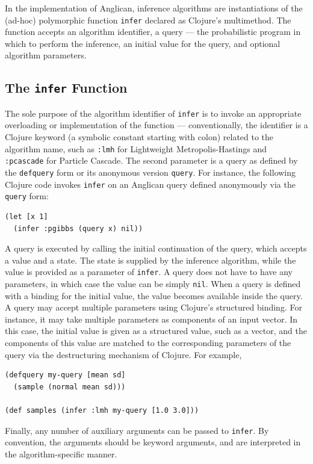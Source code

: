 \documentclass[preprint]{sigplanconf}
\begin{document}
In the implementation of Anglican, inference algorithms are
instantiations of the (ad-hoc) polymorphic function
\texttt{infer} declared as Clojure's multimethod\iftoggle{full}{
in the \texttt{anglican.{\linebreak[0]}inference}
namespace}{}. The function accepts an algorithm identifier,
a query --- the probabilistic program in which to perform the
inference, an initial value for the query, and optional
algorithm parameters.

\subsection{The \texttt{infer} Function}
\label{sec:infer}

The sole purpose of the algorithm identifier of \texttt{infer} is to invoke
an appropriate overloading or implementation of the function --- conventionally,
the identifier is a Clojure keyword (a symbolic constant starting with colon)
related to the algorithm name, such as \texttt{:lmh} for Lightweight
Metropolis-Hastings and \texttt{:pcascade} for Particle Cascade.
The second parameter is a query as defined by
the \texttt{defquery} form or its anonymous version \texttt{query}. For instance,
the following Clojure code invokes \texttt{infer} on an Anglican query
defined anonymously via the \texttt{query} form:
\begin{lstlisting}[style=default]
(let [x 1]
  (infer :pgibbs (query x) nil))
\end{lstlisting}
A query is executed by calling the initial continuation of the
query, which accepts a value and a state. The state is supplied
by the inference algorithm, while the value is provided as a
parameter of \texttt{infer}. A query does not have to have any
parameters, in which case the value can be simply \texttt{nil}.
When a query is defined with a binding for the initial value,
the value becomes available inside the query. A query may
accept multiple parameters using Clojure's structured binding.
For instance, it may take multiple parameters as components
of an input vector. In this case, the initial value is given
as a structured value, such as a vector, and the components
of this value are matched to the corresponding
parameters of the query via the destructuring mechanism of Clojure.
For example,
\begin{lstlisting}[style=default]
(defquery my-query [mean sd]
  (sample (normal mean sd)))

(def samples (infer :lmh my-query [1.0 3.0]))
\end{lstlisting}
Finally, any number of auxiliary arguments can be
passed to \texttt{infer}.
By convention, the arguments should be
keyword arguments, and are interpreted in the algorithm-specific
manner.
\end{document}
